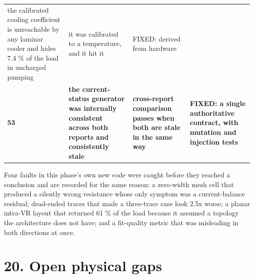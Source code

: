 \documentclass[10pt,]{article}
\begin{document}
\begin{longtable}[]{@{}llll@{}}
\begin{minipage}[t]{0.22\columnwidth}
the calibrated cooling coefficient is unreachable by any laminar cooler
and hides 7.4 \% of the load in uncharged pumping\strut
\end{minipage} & \begin{minipage}[t]{0.22\columnwidth}\raggedright
it was calibrated to a temperature, and it hit it\strut
\end{minipage} & \begin{minipage}[t]{0.22\columnwidth}\raggedright
FIXED: derived from hardware\strut
\end{minipage}\tabularnewline
\begin{minipage}[t]{0.22\columnwidth}\raggedright
\textbf{53}\strut
\end{minipage} & \begin{minipage}[t]{0.22\columnwidth}\raggedright
\textbf{the current-status generator was internally consistent across
both reports and consistently stale}\strut
\end{minipage} & \begin{minipage}[t]{0.22\columnwidth}\raggedright
\textbf{cross-report comparison passes when both are stale in the same
way}\strut
\end{minipage} & \begin{minipage}[t]{0.22\columnwidth}\raggedright
\textbf{FIXED: a single authoritative contract, with mutation and
injection tests}\strut
\end{minipage}\tabularnewline
\bottomrule
\end{longtable}

Four faults in this phase's own new code were caught before they reached
a conclusion and are recorded for the same reason: a zero-width mesh
cell that produced a silently wrong resistance whose only symptom was a
current-balance residual; dead-ended traces that made a three-trace case
look 2.5x worse; a planar intra-VR layout that returned 61 \% of the
load because it assumed a topology the architecture does not have; and a
fit-quality metric that was misleading in both directions at once.

\newpage

\hypertarget{open-physical-gaps}{%
\section{20. Open physical gaps}\label{open-physical-gaps}}
\end{document}
